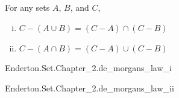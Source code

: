 \documentclass{report}
\begin{document}
\subsection{}%

  For any sets $A$, $B$, and $C$,
    \begin{enumerate}[(i)]
      \item $C - (A \cup B) = (C - A) \cap (C - B)$
      \item $C - (A \cap B) = (C - A) \cup (C - B)$
    \end{enumerate}

    {Enderton.Set.Chapter\_2.de\_morgans\_law\_i}


    {Enderton.Set.Chapter\_2.de\_morgans\_law\_ii}

\end{document}
